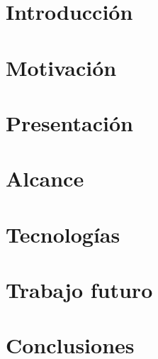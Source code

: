 \documentclass[12pt, a4paper, twoside]{article}
\begin{document}
{}



\clearpage{\pagestyle{empty}\clearpage}
\setcounter{page}{1}


\begin{TP}




\section{Introducción}

\section{Motivación}

\section{Presentación}

\section{Alcance}

\section{Tecnologías}

\section{Trabajo futuro}

\section{Conclusiones}


\printbibliography


\end{TP}
\end{document}
